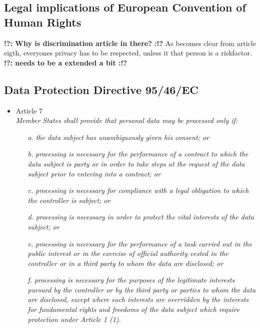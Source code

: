 \documentclass[11pt]{article}
\newcommand{\tocheck}[1]{{\bf !?: #1 :!?}}
\newcommand{\DPD}{Data Protection Directive }
\begin{document}
\subsection{Legal implications of European Convention of Human Rights}
\tocheck{Why is discrimination article in there?}
As becomes clear from article eigth, everyones privacy has to be respected, unless it that person is a riskfactor. \tocheck{needs to be a extended a bit}


\subsection{\DPD 95/46/EC}
\begin{itemize}
	\item Article 7\\
		\emph{Member States shall provide that personal data may be processed only if:}
			\begin{itemize}
				\item  [\textit{a.}] {\it the data subject has unambiguously given his consent; or}
				\item  [\textit{b.}] {\it processing is necessary for the performance of a contract to which the data subject is party or in order to take steps at the request of the data subject prior to entering into a contract; or}
				\item  [\textit{c.}] {\it processing is necessary for compliance with a legal obligation to which the controller is subject; or}
				\item  [\textit{d.}] {\it processing is necessary in order to protect the vital interests of the data subject; or}
				\item  [\textit{e.}] {\it processing is necessary for the performance of a task carried out in the public interest or in the exercise of official authority vested in the controller or in a third party to whom the data are disclosed; or}
				\item  [\textit{f.}] {\it processing is necessary for the purposes of the legitimate interests pursued by the controller or by the third party or parties to whom the data are disclosed, except where such interests are overridden by the interests for fundamental rights and freedoms of the data subject which require protection under Article 1 (1).}
			\end{itemize}


\end{itemize}
\end{document}
